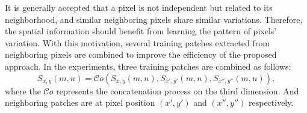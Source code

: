 \documentclass[journal]{IEEEtran}
\begin{document}
It is generally accepted that a pixel is not independent but related to its neighborhood,
and similar neighboring pixels share similar variations.
%
Therefore,
the spatial information should benefit from learning the pattern of pixels' variation.
%
With this motivation,
several training patches extracted from neighboring pixels are combined to improve the efficiency of the proposed approach.
%
In the experiments, three training patches are combined as follows:
\begin{equation}
    S_{x,y}(m,n) = \mathcal{C}o(S_{x,y}(m,n), S_{x', y'}(m,n), S_{x'', y ''}(m, n)),
\end{equation}
where the $\mathcal{C}o$ represents the concatenation process on the third dimension.
And neighboring patches are at pixel position $(x',y')$ and $(x'',y'')$ respectively.
% 
% 
\end{document}
